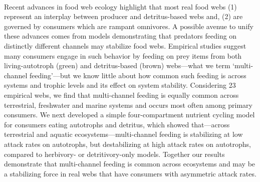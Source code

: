 \documentclass[12pt,a4paper,oneside]{article}
\begin{document}
 

\pagebreak
\linenumbers
\modulolinenumbers[2]

\\
\noindent Recent advances in food web ecology highlight that most real food webs (1) represent an interplay between producer and detritus-based webs and, (2) are governed by consumers which are rampant omnivores. A possible avenue to unify these advances comes from models demonstrating that predators feeding on distinctly
different channels may stabilize food webs. Empirical studies suggest many consumers engage in such behavior by feeding on prey items from both living-autotroph (green) and
detritus-based (brown) webs---what we term `multi-channel feeding'---but we know little about how common such feeding is across systems and trophic levels and its effect on system stability. Considering 23 empirical webs, we find that multi-channel feeding
is equally common across terrestrial, freshwater and marine systems and occurs most often
among primary consumers.  We next
developed a simple four-compartment nutrient cycling model for consumers
eating autotrophs and detritus, which showed that---across terrestrial and aquatic ecosystems---multi-channel feeding is
stabilizing at low attack rates on autotrophs, but destabilizing at high attack rates on autotrophs, compared to herbivory- or detritivory-only models. Together our results demonstrate that multi-channel feeding is common across ecosystems and may be a
stabilizing force in real webs that have consumers with asymmetric attack rates.

\end{document}

